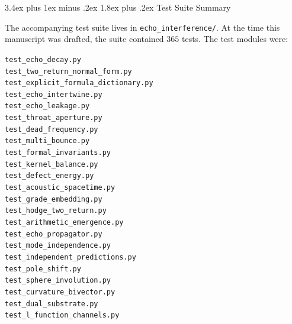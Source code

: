 \documentclass[11pt,a4paper]{article}
\makeatletter
\theoremstyle{plain}
\theoremstyle{definition}
\theoremstyle{remark}
\numberwithin{equation}{section}
\renewcommand{\section}{%
  \@startsection{section}{1}{0pt}%
    {3.4ex plus 1ex minus .2ex}%
    {1.8ex plus .2ex}%
    {\normalfont\LARGE\bfseries\color{headingAccent}}%
}
\makeatother
\begin{document}
\section{Test Suite Summary}
\label{app:tests}

The accompanying test suite lives in \texttt{echo\_interference/}.  At
the time this manuscript was drafted, the suite contained \(365\) tests.
The test modules were:
\begin{center}
\begin{minipage}{0.78\linewidth}
\small
\texttt{test\_echo\_decay.py}\\
\texttt{test\_two\_return\_normal\_form.py}\\
\texttt{test\_explicit\_formula\_dictionary.py}\\
\texttt{test\_echo\_intertwine.py}\\
\texttt{test\_echo\_leakage.py}\\
\texttt{test\_throat\_aperture.py}\\
\texttt{test\_dead\_frequency.py}\\
\texttt{test\_multi\_bounce.py}\\
\texttt{test\_formal\_invariants.py}\\
\texttt{test\_kernel\_balance.py}\\
\texttt{test\_defect\_energy.py}\\
\texttt{test\_acoustic\_spacetime.py}\\
\texttt{test\_grade\_embedding.py}\\
\texttt{test\_hodge\_two\_return.py}\\
\texttt{test\_arithmetic\_emergence.py}\\
\texttt{test\_echo\_propagator.py}\\
\texttt{test\_mode\_independence.py}\\
\texttt{test\_independent\_predictions.py}\\
\texttt{test\_pole\_shift.py}\\
\texttt{test\_sphere\_involution.py}\\
\texttt{test\_curvature\_bivector.py}\\
\texttt{test\_dual\_substrate.py}\\
\texttt{test\_l\_function\_channels.py}
\end{minipage}
\end{center}
\end{document}

